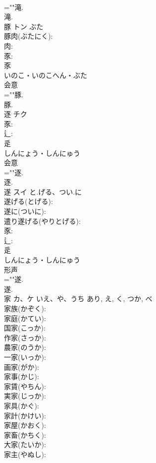 \documentclass[8pt]{extreport}
\begin{document}
\begin{CJK}{UTF8}{min}
\\	=""滝.
\\	滝.
\\	豚	トン	ぶた		
\\	豚肉(ぶたにく): 
\\	肉: 
\\	豕: 
\\	豕	
\\	いのこ・いのこへん・ぶた	
\\	会意 
\\	=""豚.
\\	豚.
\\	逐	チク			
\\	豕: 
\\	辶: 
\\	辵	
\\	しんにょう・しんにゅう	
\\	会意 
\\	=""逐.
\\	逐.
\\	遂	スイ	と.げる、つい.に		
\\	遂げる(とげる): 
\\	遂に(ついに): 
\\	遣り遂げる(やりとげる): 
\\	豕: 
\\	辶: 
\\	辵	
\\	しんにょう・しんにゅう	
\\	形声 
\\	=""遂.
\\	遂.
\\	家	カ、ケ	いえ、や、うち	あり, え, く, つか, べ	
\\	家族(かぞく): 
\\	家庭(かてい): 
\\	国家(こっか): 
\\	作家(さっか): 
\\	農家(のうか): 
\\	一家(いっか): 
\\	画家(がか): 
\\	家事(かじ): 
\\	家賃(やちん): 
\\	実家(じっか): 
\\	家具(かぐ): 
\\	家計(かけい): 
\\	家屋(かおく): 
\\	家畜(かちく): 
\\	大家(たいか): 
\\	家主(やぬし): 

\end{CJK}
\end{document}
